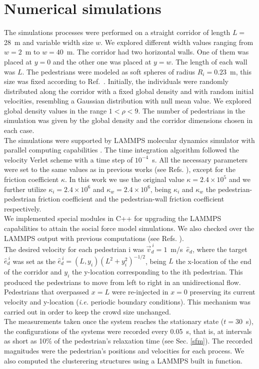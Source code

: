 \section{\label{simulations}Numerical simulations}

The simulations processes were performed on a straight corridor of length $L=$ 28~m and variable width size $w$. We explored different width values ranging from $w=2$~m to $w=40$~m. The corridor had two horizontal walls. One of them was placed at $y=0$ and the other one was placed at $y=w$. The length of each wall was $L$. The pedestrians were modeled as soft spheres of radius $R_i=0.23$~m, this size was fixed according to Ref.~\cite{metric_handbook}. Initially, the individuals were randomly distributed along the corridor with a fixed global density and with random initial velocities, resembling a Gaussian distribution with null mean value. We explored global density values in the range $1<\rho<9$. The number of pedestrians in the simulation was given by the global density and the corridor dimensions chosen in each case. \\

The simulations were supported by LAMMPS molecular dynamics simulator with parallel computing capabilities \cite{plimpton}.
The time integration algorithm followed the velocity Verlet scheme with a time step of $10^{-4}$~s. All the necessary parameters
were set to the same values as in previous works (see Refs. \cite{sticco,Dorso5}), except for the friction coefficient $\kappa$. In this work we use the original value $\kappa=2.4 \times 10^{5}$ and we further utilize $\kappa_i=2.4 \times 10^{6}$ and $\kappa_w=2.4 \times 10^{6}$, being $\kappa_i$ and $\kappa_w$ the pedestrian-pedestrian friction coefficient and the pedestrian-wall friction coefficient respectively. \\

We implemented special modules in C++ for upgrading the LAMMPS capabilities to attain the social force model simulations. We also checked over the LAMMPS output with previous computations (see Refs. \cite{sticco,Dorso6}).\\

The desired velocity for each pedestrian i was $\vec{v}_d^{~i}=1$~m/s~$\hat{e}_d$, where the target $\hat{e}_d^{~i}$ was set as the $\hat{e}_d^{~i}=(L,y_i)(L^2+y_i^2)^{-1/2}$, being $L$ the x-location of the end of the corridor and $y_i$ the y-location corresponding to the ith pedestrian. This produced the pedestrians to move from left to right in an unidirectional flow. Pedestrians that overpassed $x=L$ were re-injected in $x=0$ preserving its current velocity and y-location (\textit{i.e.} periodic boundary conditions). This mechanism was carried out in order to keep
the crowd size unchanged.\\

The measurements taken once the system reaches the stationary state ($t=30$~s), the configurations of the systems were recorded every 0.05~s, that is, at intervals as short as 10\% of the pedestrian’s relaxation time (see Sec. \ref{sfm}). The recorded magnitudes were the pedestrian’s
positions and velocities for each process. We also computed the clusterering structures using a LAMMPS built in function.  
